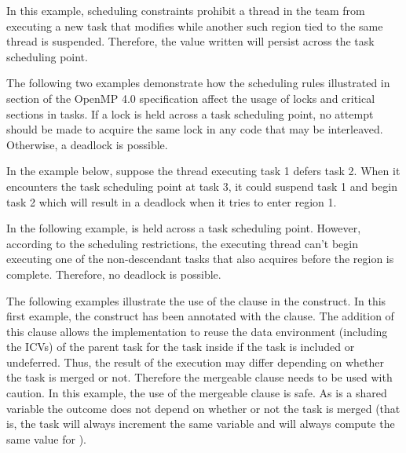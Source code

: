 

In this example, scheduling constraints prohibit a thread in the team from executing 
a new task that modifies  while another such  region tied to the 
same thread is suspended. Therefore, the value written will persist across the 
task scheduling point.



The following two examples demonstrate how the scheduling rules illustrated in 
 section of the OpenMP 4.0 specification affect the usage of locks 
and critical sections in tasks.  If a lock is held 
across a task scheduling point, no attempt should be made to acquire the same lock 
in any code that may be interleaved.  Otherwise, a deadlock is possible.

In the example below, suppose the thread executing task 1 defers task 2.  When 
it encounters the task scheduling point at task 3, it could suspend task 1 and 
begin task 2 which will result in a deadlock when it tries to enter  region 
1.



In the following example,  is held across a task scheduling point. 
 However, according to the scheduling restrictions, the executing thread can't 
begin executing one of the non-descendant tasks that also acquires  before 
the  region is complete.  Therefore, no deadlock is possible.


\clearpage

The following examples illustrate the use of the  clause in the 
 construct. In this first example, the  construct has 
been annotated with the   clause. The addition of this clause 
allows the implementation to reuse the data environment (including the ICVs) of 
the parent task for the task inside  if the task is included or undeferred. 
Thus, the result of the execution may differ depending on whether the task is merged 
or not. Therefore the mergeable clause needs to be used with caution. In this example, 
the use of the mergeable clause is safe. As  is a shared variable the 
outcome does not depend on whether or not the task is merged (that is, the task 
will always increment the same variable and will always compute the same value 
for ).

